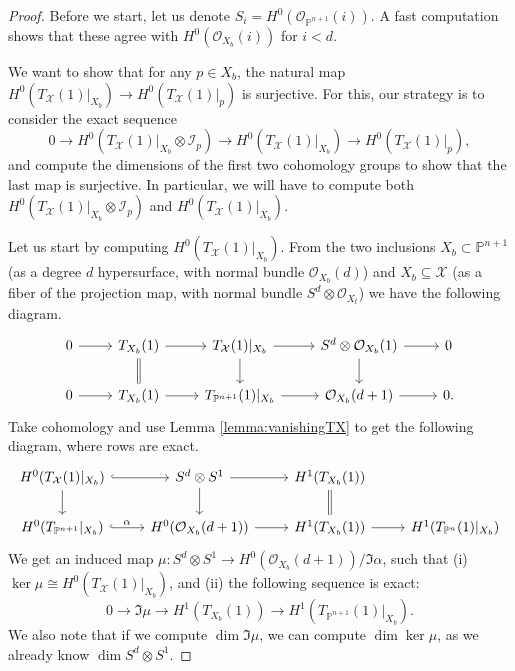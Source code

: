 \documentclass[leqno, openany]{memoir}
\theoremstyle{definition}
\theoremstyle{remark}
\theoremstyle{plain}
\theoremstyle{definition}
\theoremstyle{remark}
\renewcommand{\P}{\mathbb{P}}
\newcommand{\mc}[1]{\mathcal{#1}}
\begin{document}
\begin{proof}
    Before we start, let us denote $S_i=H^0(\mc{O}_{\P^{n+1}}(i))$. A fast computation shows that these agree with $H^0(\mc{O}_{X_b}(i))$ for $i<d$. 

    We want to show that for any $p \in X_b$, the natural map $H^0(T_{ \mc{X} }(1)|_{X_b}) \to H^0(T_{ \mc{X} }(1)|_p)$ is surjective. For this, our strategy is to consider the exact sequence
    \[ 0 \to H^0(T_{ \mc{X} }(1)|_{X_b}\otimes \mc{I}_p) \to H^0(T_{ \mc{X} }(1)|_{X_b}) \to H^0(T_{ \mc{X} }(1)|_p), \]
    and compute the dimensions of the first two cohomology groups to show that the last map is surjective. In particular, we will have to compute both $H^0(T_{ \mc{X} }(1)|_{X_b} \otimes \mc{I}_p)$ and $H^0(T_{ \mc{X} }(1)|_{X_b})$.

    Let us start by computing $H^0(T_{ \mc{X} }(1)|_{X_b})$. From the two inclusions $X_b \subset \P^{n+1}$ (as a degree $d$ hypersurface, with normal bundle $\mc{O}_{X_b}(d)$) and $X_b \subseteq \mc{X}$ (as a fiber of the projection map, with normal bundle $S^d \otimes \mc{O}_{X_t}$) we have the following diagram.
\begin{equation} \label{eq:doubletangent}
    \begin{tikzcd} 0 \arrow[r] & T_{X_b}(1) \arrow[r] \arrow[d, equal] & T_{ \mc{X} }(1)|_{X_b} \arrow[r] \arrow[d] & S^d \otimes \mc{O}_{X_b}(1) \arrow[r] \arrow[d] & 0 \\ 0 \arrow[r] & T_{X_b}(1) \arrow[r] & T_{\P^{n+1}}(1)|_{X_b} \arrow[r] & \mc{O}_{X_b}(d+1) \arrow[r] & 0. \end{tikzcd}
\end{equation}
Take cohomology and use Lemma \ref{lemma:vanishingTX} to get the following diagram, where rows are exact. 
    \[ \begin{tikzcd} H^0(T_{ \mc{X} }(1)|_{X_b}) \arrow[r, hook] \arrow[d] & S^d \otimes S^1 \arrow[r] \arrow[d] & H^1(T_{X_b}(1)) \arrow[d, equal] \\ H^0(T_{\P^{n+1}}|_{X_b}) \arrow[r, hook, "\alpha"] & H^0(\mc{O}_{X_b}(d+1)) \arrow[r] & H^1(T_{X_b}(1)) \arrow[r] & H^1(T_{\P^n}(1)|_{X_b}) \end{tikzcd} \]
        We get an induced map $\mu\colon S^d \otimes S^1 \to H^0(\mc{O}_{X_b}(d+1))/\Im \alpha$, such that (i) $\ker \mu \cong H^0(T_{ \mc{X} }(1)|_{X_b})$, and (ii) the following sequence is exact:
\begin{equation} \label{eq:seqimmu}
0 \to \Im \mu \to H^1(T_{X_b}(1)) \to H^1(T_{\P^{n+1}}(1)|_{X_b}).
\end{equation}
We also note that if we compute $\dim \Im \mu$, we can compute $\dim \ker \mu$, as we already know $\dim S^d \otimes S^1$. 


\end{proof}
\end{document}
